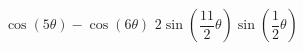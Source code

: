 {$\cos(5\theta) - \cos(6\theta)$}
{$2\sin \left( \dfrac{11}{2}\theta \right) \sin \left( \dfrac{1}{2}\theta \right)$}
